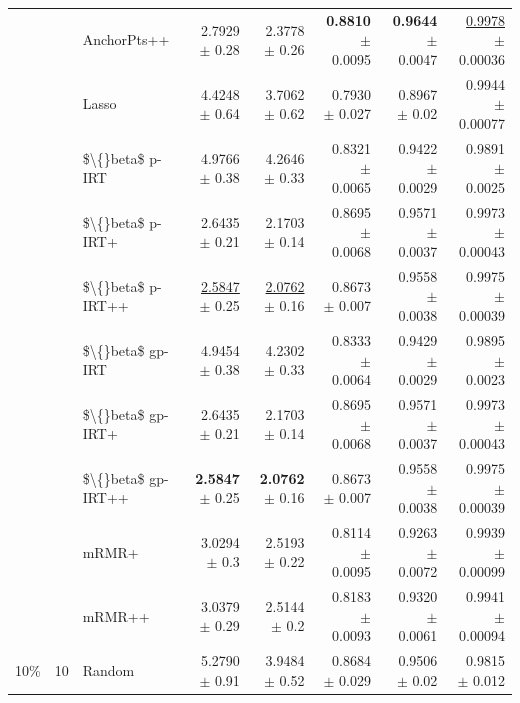 \begin{longtable}{llp{}rrrrr}
 &  & AnchorPts++ & 2.7929 {\scriptsize $\pm$ 0.28} & 2.3778 {\scriptsize $\pm$ 0.26} & \textbf{0.8810} {\scriptsize $\pm$ 0.0095} & \textbf{0.9644} {\scriptsize $\pm$ 0.0047} & \underline{0.9978} {\scriptsize $\pm$ 0.00036} \\
 &  & Lasso & 4.4248 {\scriptsize $\pm$ 0.64} & 3.7062 {\scriptsize $\pm$ 0.62} & 0.7930 {\scriptsize $\pm$ 0.027} & 0.8967 {\scriptsize $\pm$ 0.02} & 0.9944 {\scriptsize $\pm$ 0.00077} \\
 &  & \$\textbackslash\{\}beta\$ p-IRT & 4.9766 {\scriptsize $\pm$ 0.38} & 4.2646 {\scriptsize $\pm$ 0.33} & 0.8321 {\scriptsize $\pm$ 0.0065} & 0.9422 {\scriptsize $\pm$ 0.0029} & 0.9891 {\scriptsize $\pm$ 0.0025} \\
 &  & \$\textbackslash\{\}beta\$ p-IRT+ & 2.6435 {\scriptsize $\pm$ 0.21} & 2.1703 {\scriptsize $\pm$ 0.14} & 0.8695 {\scriptsize $\pm$ 0.0068} & 0.9571 {\scriptsize $\pm$ 0.0037} & 0.9973 {\scriptsize $\pm$ 0.00043} \\
 &  & \$\textbackslash\{\}beta\$ p-IRT++ & \underline{2.5847} {\scriptsize $\pm$ 0.25} & \underline{2.0762} {\scriptsize $\pm$ 0.16} & 0.8673 {\scriptsize $\pm$ 0.007} & 0.9558 {\scriptsize $\pm$ 0.0038} & 0.9975 {\scriptsize $\pm$ 0.00039} \\
 &  & \$\textbackslash\{\}beta\$ gp-IRT & 4.9454 {\scriptsize $\pm$ 0.38} & 4.2302 {\scriptsize $\pm$ 0.33} & 0.8333 {\scriptsize $\pm$ 0.0064} & 0.9429 {\scriptsize $\pm$ 0.0029} & 0.9895 {\scriptsize $\pm$ 0.0023} \\
 &  & \$\textbackslash\{\}beta\$ gp-IRT+ & 2.6435 {\scriptsize $\pm$ 0.21} & 2.1703 {\scriptsize $\pm$ 0.14} & 0.8695 {\scriptsize $\pm$ 0.0068} & 0.9571 {\scriptsize $\pm$ 0.0037} & 0.9973 {\scriptsize $\pm$ 0.00043} \\
 &  & \$\textbackslash\{\}beta\$ gp-IRT++ & \textbf{2.5847} {\scriptsize $\pm$ 0.25} & \textbf{2.0762} {\scriptsize $\pm$ 0.16} & 0.8673 {\scriptsize $\pm$ 0.007} & 0.9558 {\scriptsize $\pm$ 0.0038} & 0.9975 {\scriptsize $\pm$ 0.00039} \\
 &  & mRMR+ & 3.0294 {\scriptsize $\pm$ 0.3} & 2.5193 {\scriptsize $\pm$ 0.22} & 0.8114 {\scriptsize $\pm$ 0.0095} & 0.9263 {\scriptsize $\pm$ 0.0072} & 0.9939 {\scriptsize $\pm$ 0.00099} \\
 &  & mRMR++ & 3.0379 {\scriptsize $\pm$ 0.29} & 2.5144 {\scriptsize $\pm$ 0.2} & 0.8183 {\scriptsize $\pm$ 0.0093} & 0.9320 {\scriptsize $\pm$ 0.0061} & 0.9941 {\scriptsize $\pm$ 0.00094} \\
\midrule
10\% & 10 & Random & 5.2790 {\scriptsize $\pm$ 0.91} & 3.9484 {\scriptsize $\pm$ 0.52} & 0.8684 {\scriptsize $\pm$ 0.029} & 0.9506 {\scriptsize $\pm$ 0.02} & 0.9815 {\scriptsize $\pm$ 0.012} \\

\end{longtable}
